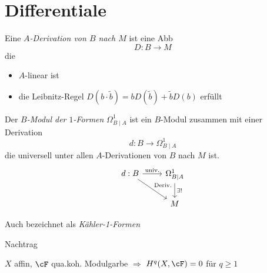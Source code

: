 \section{Differentiale} %

\begin{definition}
Eine \emph{$A$-Derivation von $B$ nach $M$} ist eine Abb
\[
  D:B\rightarrow M
\]
die
\begin{itemize}
\item $A$-linear ist
\item die Leibnitz-Regel $D(b\cdot\tilde b)=bD(\tilde b)+\tilde bD(b)$
erfüllt
\end{itemize}
\end{definition}

\begin{definition}
Der \emph{$B$-Modul der $1$-Formen} $\Omega_{B\mid A}^1$ ist ein $B$-Modul
zusammen mit einer Derivation
\[
  d:B\rightarrow \Omega_{B\mid A}^1
\]
die universell unter allen $A$-Derivationen von $B$ nach $M$ ist.
	\[\begin{tikzcd}
		d:B \rar{\text{univ.}} \arrow{dr}{\text{Deriv.}} & \Omega_{B\mid A}^1 \dar{\exists!} \\
		                                                 & M
	\end{tikzcd}\]
\end{definition}
\begin{bemerkung}
Auch bezeichnet als \emph{Kähler-1-Formen}
\end{bemerkung}

\begin{einschub}{Nachtrag}
\begin{satz}
$X$ affin, $\cF$ qua.koh. Modulgarbe $\Rightarrow$ $H^q(X,\cF)=0$ für $q\geq 1$
\end{satz}
\TODO
\end{einschub}
